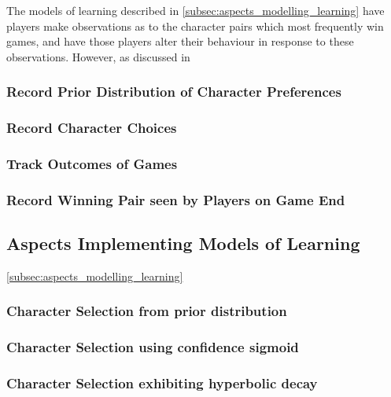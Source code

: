 The models of learning described in \cref{subsec:aspects_modelling_learning} have players
make observations as to the character pairs which most frequently win games, and
have those players alter their behaviour in response to these observations. However,
as discussed in 

\subsubsection{Record Prior Distribution of Character Preferences}

\subsubsection{Record Character Choices}

\subsubsection{Track Outcomes of Games}

\subsubsection{Record Winning Pair seen by Players on Game End}


\subsection{Aspects Implementing Models of Learning}\cref{subsec:aspects_modelling_learning}

\subsubsection{Character Selection from prior distribution}

\subsubsection{Character Selection using confidence sigmoid}

\subsubsection{Character Selection exhibiting hyperbolic decay}



